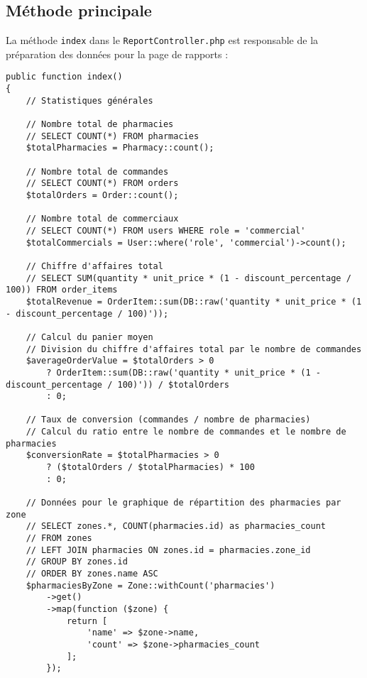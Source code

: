 \documentclass[12pt,a4paper]{article}
\begin{document}
\subsection{Méthode principale}
La méthode \texttt{index} dans le \texttt{ReportController.php} est responsable de la préparation des données pour la page de rapports :

\begin{lstlisting}[caption=Méthode index du ReportController]
public function index()
{
    // Statistiques générales
    
    // Nombre total de pharmacies
    // SELECT COUNT(*) FROM pharmacies
    $totalPharmacies = Pharmacy::count();
    
    // Nombre total de commandes
    // SELECT COUNT(*) FROM orders
    $totalOrders = Order::count();
    
    // Nombre total de commerciaux
    // SELECT COUNT(*) FROM users WHERE role = 'commercial'
    $totalCommercials = User::where('role', 'commercial')->count();
    
    // Chiffre d'affaires total
    // SELECT SUM(quantity * unit_price * (1 - discount_percentage / 100)) FROM order_items
    $totalRevenue = OrderItem::sum(DB::raw('quantity * unit_price * (1 - discount_percentage / 100)'));
    
    // Calcul du panier moyen
    // Division du chiffre d'affaires total par le nombre de commandes
    $averageOrderValue = $totalOrders > 0 
        ? OrderItem::sum(DB::raw('quantity * unit_price * (1 - discount_percentage / 100)')) / $totalOrders 
        : 0;
    
    // Taux de conversion (commandes / nombre de pharmacies)
    // Calcul du ratio entre le nombre de commandes et le nombre de pharmacies
    $conversionRate = $totalPharmacies > 0 
        ? ($totalOrders / $totalPharmacies) * 100 
        : 0;
    
    // Données pour le graphique de répartition des pharmacies par zone
    // SELECT zones.*, COUNT(pharmacies.id) as pharmacies_count 
    // FROM zones
    // LEFT JOIN pharmacies ON zones.id = pharmacies.zone_id
    // GROUP BY zones.id
    // ORDER BY zones.name ASC
    $pharmaciesByZone = Zone::withCount('pharmacies')
        ->get()
        ->map(function ($zone) {
            return [
                'name' => $zone->name,
                'count' => $zone->pharmacies_count
            ];
        });
    

\end{lstlisting}
\end{document}
